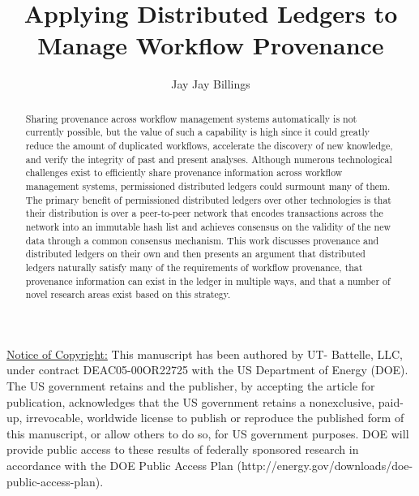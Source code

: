 \documentclass[sigconf]{acmart}
\begin{document}
\title{Applying Distributed Ledgers to Manage Workflow Provenance}

\author{Jay Jay Billings}


\begin{abstract}
Sharing provenance across workflow management systems automatically is not currently possible, but the value of such a capability is high since it could greatly reduce the amount of duplicated workflows, accelerate the discovery of new knowledge, and verify the integrity of past and present analyses. Although numerous technological challenges exist to efficiently share provenance information across workflow management systems, permissioned distributed ledgers could surmount many of them. The primary benefit of permissioned distributed ledgers over other technologies is that their distribution is over a peer-to-peer network that encodes transactions across the network into an immutable hash list and achieves consensus on the validity of the new data through a common consensus mechanism. This work discusses provenance and distributed ledgers on their own and then presents an argument that distributed ledgers naturally satisfy many of the requirements of workflow provenance, that provenance information can exist in the ledger in multiple ways, and that a number of novel research areas exist based on this strategy.
\end{abstract}



\maketitle

\underline{Notice of Copyright:} This manuscript has been authored by UT-
Battelle, LLC, under contract DEAC05-00OR22725 with the US Department of
Energy (DOE). The US government retains and the publisher, by accepting
the article for publication, acknowledges that the US government
retains a nonexclusive, paid-up, irrevocable, worldwide license to publish or
reproduce the published form of this manuscript, or allow others to do so, for
US government purposes. DOE will provide
public access to these results of federally sponsored research in accordance
with the DOE Public Access Plan (http://energy.gov/downloads/doe-public-access-plan).
\end{document}
